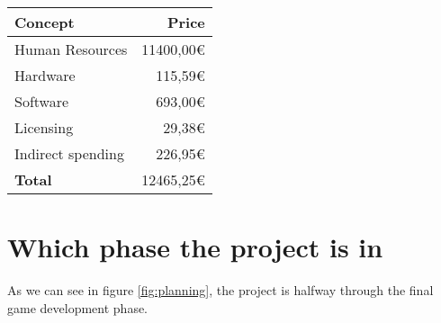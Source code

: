 \begin{center}
    \begin{tabular}{ | l | r | }
        \hline
        \textbf{Concept} & \textbf{Price} \\
        \hline
        \hline
        Human Resources & 11400,00€ \\  
        Hardware & 115,59€ \\  
        Software & 693,00€ \\  
        Licensing & 29,38€ \\
        Indirect spending & 226,95€ \\
        \hline
        \textbf{Total} & 12465,25€ \\      
        \hline
    \end{tabular}
\end{center}

\section{Which phase the project is in}

As we can see in figure \ref{fig:planning}, the project is halfway through the final game development phase.
